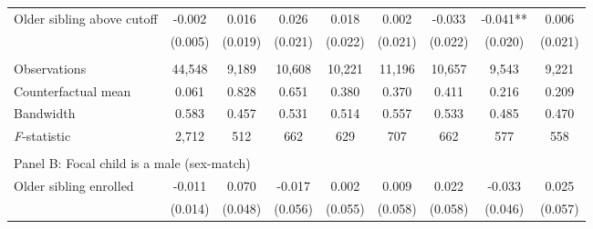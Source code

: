 \begin{table}[!htbp]
{{\begin{tabular}{lcccccccc}
Older sibling above cutoff&      -0.002   &       0.016   &       0.026   &       0.018   &       0.002   &      -0.033   &      -0.041** &       0.006   \\
                    &     (0.005)   &     (0.019)   &     (0.021)   &     (0.022)   &     (0.021)   &     (0.022)   &     (0.020)   &     (0.021)   \\
                    &               &               &               &               &               &               &               &               \\
Observations        &      44,548   &       9,189   &      10,608   &      10,221   &      11,196   &      10,657   &       9,543   &       9,221   \\
Counterfactual mean &       0.061   &       0.828   &       0.651   &       0.380   &       0.370   &       0.411   &       0.216   &       0.209   \\
Bandwidth           &       0.583   &       0.457   &       0.531   &       0.514   &       0.557   &       0.533   &       0.485   &       0.470   \\
\textit{F}-statistic&       2,712   &         512   &         662   &         629   &         707   &         662   &         577   &         558   \\
 
&  &  &  &  \\
\multicolumn{10}{l}{Panel B: Focal child is a male (sex-match)} \\
Older sibling enrolled&      -0.011   &       0.070   &      -0.017   &       0.002   &       0.009   &       0.022   &      -0.033   &       0.025   \\
                    &     (0.014)   &     (0.048)   &     (0.056)   &     (0.055)   &     (0.058)   &     (0.058)   &     (0.046)   &     (0.057)   \\
 

\end{tabular}}}
\end{table}
